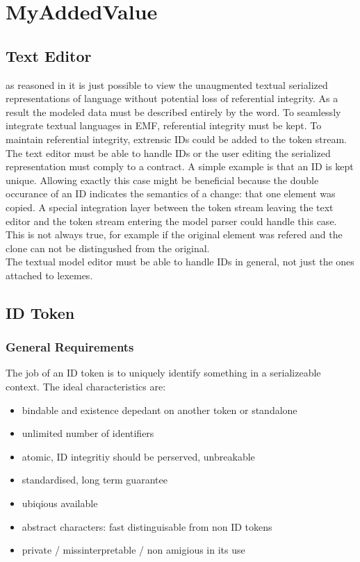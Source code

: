\chapter{MyAddedValue}


\section{Text Editor}
as reasoned in  it is just possible to view the unaugmented textual serialized representations of language without potential loss of referential integrity. As a result the modeled data must be described entirely by the word. To seamlessly integrate textual languages in EMF, referential integrity must be kept. To maintain referential integrity, extrensic IDs could be added  to the token stream. The text editor must be able to handle IDs or the user editing the serialized representation must comply to a contract. A simple example is that an ID is kept unique. Allowing exactly this case might be beneficial because the double occurance of an ID indicates the semantics of a change: that one element was copied. A special integration layer between the token stream leaving the text editor and the token stream entering the model parser could handle this case. This is not always true, for example if the original element was refered and the clone can not be distingushed from the original. \\
The textual model editor must be able to handle IDs in general, not just the ones attached to lexemes. 


\section{ID Token}
\subsection{General Requirements}
The job of an ID token is to uniquely identify something in a serializeable context. 
The ideal characteristics are:
\begin{itemize}
	\item bindable and existence depedant on another token or standalone
	\item unlimited number of identifiers
	\item atomic, ID integritiy should be perserved, unbreakable
	\item standardised, long term guarantee
	\item ubiqious available
	\item abstract characters: fast distinguisable from non ID tokens
	\item private / missinterpretable / non amigious in its use
\end{itemize}

